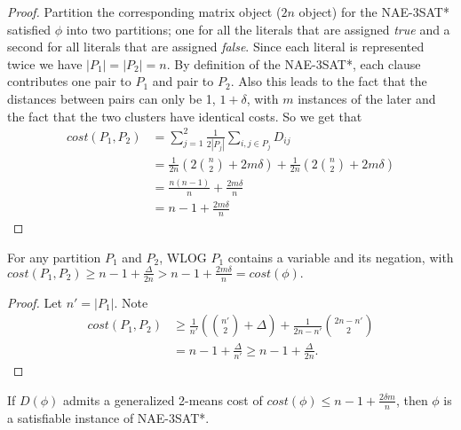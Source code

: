 \begin{proof}
Partition the corresponding matrix object ($2n$ object) for the
NAE-3SAT* satisfied $\phi$ into two partitions; one for all the
literals that are assigned \textit{true} and a second for all literals
that are assigned \textit{false}.  Since each literal is represented
twice we have $|P_1| = |P_2| = n$.   By definition of the NAE-3SAT*,
each clause contributes one pair to $P_1$ and pair to $P_2$.   Also
this leads to the fact that the distances between pairs can only be 1,
$1+\delta$, with $m$ instances of the later and the fact that the two
clusters have identical costs. So we get that 
\begin{align*}
cost(P_1,P_2) &= \sum_{j=1}^{2} \frac{1}{2|P_j|} \sum_{i,j \in P_j}
D_{ij}\\ 
&= \frac{1}{2n}( 2 {n \choose 2} + 2m\delta ) + \frac{1}{2n}( 2 {n
  \choose 2} + 2m\delta ) \\ 
&= \frac{ n (n-1) } {n} + \frac{2 m \delta}{n} \\
&= n - 1 +  \frac{2 m \delta}{n}
\end{align*}
\end{proof}

\begin{lemma} \label{different-partitions}
For any partition $P_1$ and $P_2$, WLOG $P_1$ contains a variable and
its negation, with $cost(P_1,P_2) \ge n - 1 + \frac{\Delta}{2n} > n -
1 + \frac{2m\delta}{n} = cost(\phi).$ 
\end{lemma}

\begin{proof}
Let $n' = |P_1|$.  Note
\begin{align*}
cost(P_1,P_2) &\ge \frac{1}{n'}({n' \choose 2} + \Delta ) +
\frac{1}{2n-n'}{2n-n' \choose 2}  \\ 
&= n - 1 + \frac{\Delta}{n'} \ge n-1 +\frac{\Delta}{2n}.
\end{align*}
\end{proof}


\begin{lemma} \label{satisfiable-instance}
If $D(\phi)$  admits a generalized 2-means cost of $cost(\phi) \le n -
1 + \frac{2\delta m}{n}$, then $\phi$ is a satisfiable instance of
NAE-3SAT*. 
\end{lemma}

